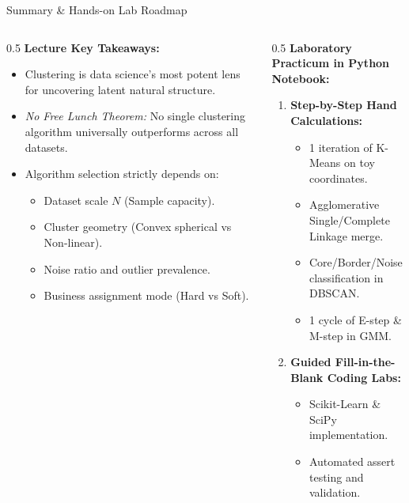 \documentclass[aspectratio=169,10pt]{beamer}
\begin{document}
\begin{frame}{Summary \& Hands-on Lab Roadmap}
  \begin{columns}[T]
    \begin{column}{0.5\textwidth}
      \textbf{Lecture Key Takeaways:}
      \begin{itemize}\setlength{\itemsep}{2pt}
        \item Clustering is data science's most potent lens for uncovering latent natural structure.
        \item \textit{No Free Lunch Theorem:} No single clustering algorithm universally outperforms across all datasets.
        \item Algorithm selection strictly depends on:
          \begin{itemize}\setlength{\itemsep}{1pt}
            \item Dataset scale $N$ (Sample capacity).
            \item Cluster geometry (Convex spherical vs Non-linear).
            \item Noise ratio and outlier prevalence.
            \item Business assignment mode (Hard vs Soft).
          \end{itemize}
      \end{itemize}
    \end{column}
    \begin{column}{0.5\textwidth}
      \textbf{Laboratory Practicum in Python Notebook:}
      \begin{enumerate}\setlength{\itemsep}{2pt}
        \item \textbf{Step-by-Step Hand Calculations:}
          \begin{itemize}
            \item 1 iteration of K-Means on toy coordinates.
            \item Agglomerative Single/Complete Linkage merge.
            \item Core/Border/Noise classification in DBSCAN.
            \item 1 cycle of E-step \& M-step in GMM.
          \end{itemize}
        \item \textbf{Guided Fill-in-the-Blank Coding Labs:}
          \begin{itemize}
            \item Scikit-Learn \& SciPy implementation.
            \item Automated assert testing and validation.
          \end{itemize}
      \end{enumerate}
    \end{column}
  \end{columns}
\end{frame}
\end{document}
